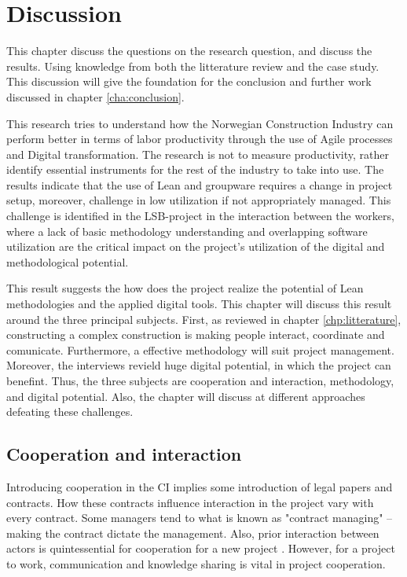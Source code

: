 
\chapter{Discussion} \label{cha:discussion}
This chapter discuss the questions on the research question, and discuss the results. Using knowledge from both the litterature review and the case study. This discussion will give the foundation for the conclusion and further work discussed in chapter \ref{cha:conclusion}.

This research tries to understand how the Norwegian Construction Industry can perform better in terms of labor productivity through the use of Agile processes and Digital transformation. The research is not to measure productivity, rather identify essential instruments for the rest of the industry to take into use. The results indicate that the use of Lean and groupware requires a change in project setup, moreover, challenge in low utilization if not appropriately managed. This challenge is identified in the LSB-project in the interaction between the workers, where a lack of basic methodology understanding and overlapping software utilization are the critical impact on the project's utilization of the digital and methodological potential. 

This result suggests the how does the project realize the potential of Lean methodologies and the applied digital tools. This chapter will discuss this result around the three principal subjects. First, as reviewed in chapter \ref{chp:litterature}, constructing a complex construction is making people interact, coordinate and comunicate. Furthermore, a effective methodology will suit project management. Moreover, the interviews revield huge digital potential, in which the project can benefint. Thus, the three subjects are cooperation and interaction, methodology, and digital potential. Also, the chapter will discuss at different approaches defeating these challenges.

\section{Cooperation and interaction}
Introducing cooperation in the CI implies some introduction of legal papers and contracts. How these contracts influence interaction in the project vary with every contract. Some managers tend to what is known as "contract managing" – making the contract dictate the management. Also, prior interaction between actors is quintessential for cooperation for a new project \cite{rolfsen}. However, for a project to work, communication and knowledge sharing is vital in project cooperation. 


